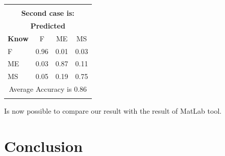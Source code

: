 \documentclass[12pt]{article} %
\begin{document}
\begin{minipage}{0.5\textwidth}
\begin{center}
\begin{tabular}{l|c|c|c|}
\multicolumn{4}{c}{}\\
 \multicolumn{4}{c}{ \textbf{Second case is:}}\\
 \multicolumn{4}{c}{ \textbf{ Predicted}}\\
 \textbf{Know}&F&ME&MS\\ \hline\hline
F   &0.96&0.01&0.03\\
ME &0.03&0.87&0.11\\
MS &0.05&0.19&0.75\\
\multicolumn{4}{c}{Average Accuracy is 0.86}\\
\multicolumn{4}{c}{}\\
\end{tabular}
\end{center}
\end{minipage}
Is now possible to compare our result with the result of MatLab tool.

\newpage

\section {Conclusion}
\end{document}
